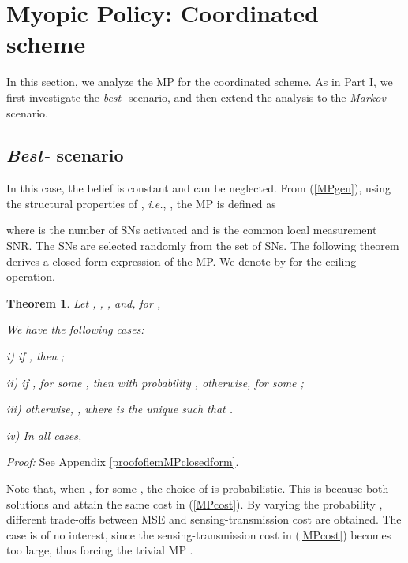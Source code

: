 \documentclass[10pt,twocolumn,twoside]{IEEEtran}
\newtheorem{thm}{Theorem}
\theoremstyle{plain}
\begin{document}
\section{Myopic Policy: Coordinated scheme}
\label{analysisCoord}
\noindent In this section, we analyze the MP for the coordinated scheme.
As in Part I, we first investigate the \emph{best-} scenario, and then extend the analysis
 to the \emph{Markov-} scenario.
\vspace{-2mm}
\subsection{\emph{Best-} scenario}
\label{bestomegacoord}
\noindent In this case, the belief  is constant and  can be neglected.
From (\ref{MPgen}), using the structural properties of \cite[Prop.~2]{MichelusiP1}, \emph{i.e.}, , the MP is defined as

where  is the number of SNs activated and 
is the common local measurement SNR. 
The  SNs are selected randomly from the set of  SNs.
The following theorem derives a closed-form expression of the MP.
We denote by  for  the ceiling operation.
\vspace{-7mm}
\begin{thm}
\label{lemMPclosedform}
Let ,
,
,
and, for ,

 We have the following cases:
 
\noindent \emph{i)} if , then ;

\noindent \emph{ii)} if , for some , then  with probability ,
  otherwise, for some ;

\noindent \emph{iii)} otherwise, , where   is the unique  such that  . 

\noindent \emph{iv)} In all cases,

\end{thm}
\noindent\emph{Proof:}
See Appendix \ref{proofoflemMPclosedform}.
\hfill\QED

\noindent Note that, when , for some , the choice of  is probabilistic.
This is because both solutions  and 
attain the same cost in (\ref{MPcost}). By varying the probability , different trade-offs between MSE and sensing-transmission cost are obtained. 
The case  is of no interest, since the sensing-transmission cost
in (\ref{MPcost}) becomes too large, thus forcing the trivial MP .
\end{document}
